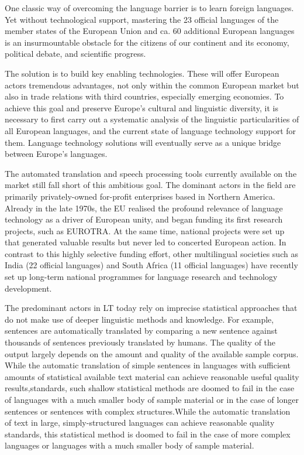 \documentclass[]{../../metanetpaper}
\begin{document}
\begin{Parallel}[c]{77mm}{77mm}
{One classic way of overcoming the language barrier is to learn foreign
languages. Yet without technological support, mastering the 23
official languages of the member states of the European Union and
ca. 60 additional European languages is an insurmountable obstacle for
the citizens of our continent and its economy, political debate, and
scientific progress.

The solution is to build key enabling technologies. These will offer European
actors tremendous advantages, not only within the common European market but
also in trade relations with third countries, especially emerging economies. To
achieve this goal and preserve Europe’s cultural and linguistic diversity, it
is necessary to first carry out a systematic analysis of the linguistic
particularities of all European languages, and the current state of language
technology support for them. Language technology solutions will eventually
serve as a unique bridge between Europe’s languages.


The automated translation and speech processing tools currently available on
the market still fall short of this ambitious goal. The dominant actors in the
field are primarily privately-owned for-profit enterprises based in Northern
America. Already in the late 1970s, the EU realised the profound relevance of
language technology as a driver of European unity, and began funding its first
research projects, such as EUROTRA. At the same time, national projects were
set up that generated valuable results but never led to concerted European
action. In contrast to this highly selective funding effort, other multilingual
societies such as India (22 official languages) and South Africa (11 official
languages) have recently set up long-term national programmes for language
research and technology development.

The predominant actors in LT today rely on imprecise statistical approaches
that do not make use of deeper linguistic methods and knowledge. For example,
sentences are automatically translated by comparing a new sentence against
thousands of sentences previously translated by humans. The quality of the
output largely depends on the amount and quality of the available sample
corpus. While the automatic translation of simple sentences in languages with
sufficient amounts of statistical available text material can achieve
reasonable useful quality results,standards, such shallow statistical methods
are doomed to fail in the case of languages with a much smaller body of sample
material or in the case of longer sentences or sentences with complex
structures.While the automatic translation of text in large, simply-structured
languages can achieve reasonable quality standards, this statistical method is
doomed to fail in the case of more complex languages or languages with a much
smaller body of sample material.

}
\end{Parallel}
\end{document}
